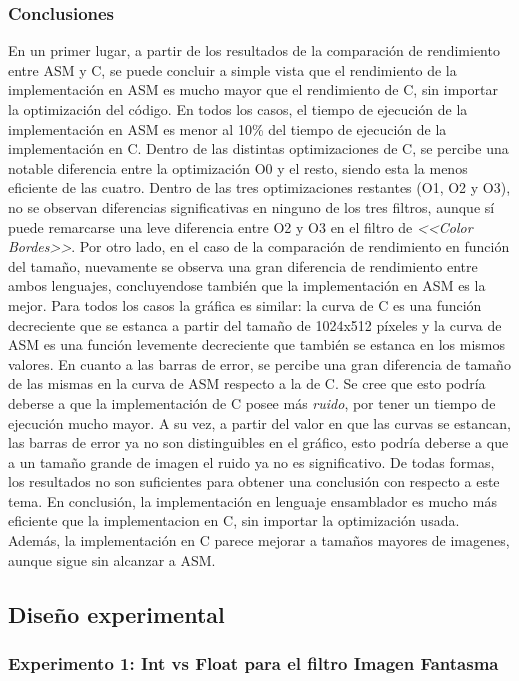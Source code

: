 \documentclass[a4paper]{article}
\begin{document}
\subsubsection{Conclusiones}
\justify 
En un primer lugar, a partir de los resultados de la comparación de rendimiento entre ASM y C, se puede concluir a simple vista que el rendimiento de la implementación en ASM es mucho mayor que el rendimiento de C, sin importar la optimización del código. En todos los casos, el tiempo de ejecución de la implementación en ASM es menor al 10\% del tiempo de ejecución de la implementación en C. Dentro de las distintas optimizaciones de C, se percibe una notable diferencia entre la optimización O0 y el resto, siendo esta la menos eficiente de las cuatro. Dentro de las tres optimizaciones restantes (O1, O2 y O3), no se observan diferencias significativas en ninguno de los tres filtros, aunque sí puede remarcarse una leve diferencia entre O2 y O3 en el filtro de \textit{<<Color Bordes>>}.
\justify 
Por otro lado, en el caso de la comparación de rendimiento en función del tamaño, nuevamente se observa una gran diferencia de rendimiento entre ambos lenguajes, concluyendose también que la implementación en ASM es la mejor. Para todos los casos la gráfica es similar: la curva de C es una función decreciente que se estanca a partir del tamaño de 1024x512 píxeles y la curva de ASM es una función levemente decreciente que también se estanca en los mismos valores. En cuanto a las barras de error, se percibe una gran diferencia de tamaño de las mismas en la curva de ASM respecto a la de C. Se cree que esto podría deberse a que la implementación de C posee más \textit{ruido}, por tener un tiempo de ejecución mucho mayor. A su vez, a partir del valor en que las curvas se estancan, las barras de error ya no son distinguibles en el gráfico, esto podría deberse a que a un tamaño grande de imagen el ruido ya no es significativo. De todas formas, los resultados no son suficientes para obtener una conclusión con respecto a este tema.
\justify En conclusión, la implementación en lenguaje ensamblador es mucho más eficiente que la implementacion en C, sin importar la optimización usada. Además, la implementación en C parece mejorar a tamaños mayores de imagenes, aunque sigue sin alcanzar a ASM.

     
\subsection{Diseño experimental}

\subsubsection{Experimento 1: Int vs Float para el filtro Imagen Fantasma}
\end{document}
